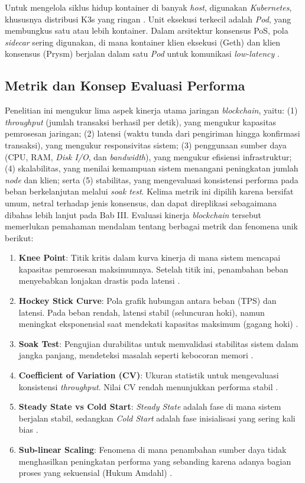 Untuk mengelola siklus hidup kontainer di banyak \textit{host}, digunakan \textit{Kubernetes}, khususnya distribusi K3s yang ringan \cite{k3s_io}. Unit eksekusi terkecil adalah \textit{Pod}, yang membungkus satu atau lebih kontainer. Dalam arsitektur konsensus PoS, pola \textit{sidecar} sering digunakan, di mana kontainer klien eksekusi (Geth) dan klien konsensus (Prysm) berjalan dalam satu \textit{Pod} untuk komunikasi \textit{low-latency} \cite{singh2020}.

\subsection{Metrik dan Konsep Evaluasi Performa}

Penelitian ini mengukur lima aspek kinerja utama jaringan \textit{blockchain}, yaitu: (1) \textit{throughput} (jumlah transaksi berhasil per detik), yang mengukur kapasitas pemrosesan jaringan; (2) latensi (waktu tunda dari pengiriman hingga konfirmasi transaksi), yang mengukur responsivitas sistem; (3) penggunaan sumber daya (CPU, RAM, \textit{Disk I/O}, dan \textit{bandwidth}), yang mengukur efisiensi infrastruktur; (4) skalabilitas, yang menilai kemampuan sistem menangani peningkatan jumlah \textit{node} dan klien; serta (5) stabilitas, yang mengevaluasi konsistensi performa pada beban berkelanjutan melalui \textit{soak test}. Kelima metrik ini dipilih karena bersifat umum, netral terhadap jenis konsensus, dan dapat direplikasi sebagaimana dibahas lebih lanjut pada Bab III. Evaluasi kinerja \textit{blockchain} tersebut memerlukan pemahaman mendalam tentang berbagai metrik dan fenomena unik berikut:

\begin{enumerate}
    \item \textbf{Knee Point}: Titik kritis dalam kurva kinerja di mana sistem mencapai kapasitas pemrosesan maksimumnya. Setelah titik ini, penambahan beban menyebabkan lonjakan drastis pada latensi \cite{avritzer2020}.
    \item \textbf{Hockey Stick Curve}: Pola grafik hubungan antara beban (TPS) dan latensi. Pada beban rendah, latensi stabil (seluncuran hoki), namun meningkat eksponensial saat mendekati kapasitas maksimum (gagang hoki) \cite{gregg2020}.
    \item \textbf{Soak Test}: Pengujian durabilitas untuk memvalidasi stabilitas sistem dalam jangka panjang, mendeteksi masalah seperti kebocoran memori \cite{hyperledger_caliper}.
    \item \textbf{Coefficient of Variation (CV)}: Ukuran statistik untuk mengevaluasi konsistensi \textit{throughput}. Nilai CV rendah menunjukkan performa stabil \cite{jain1991}.
    \item \textbf{Steady State vs Cold Start}: \textit{Steady State} adalah fase di mana sistem berjalan stabil, sedangkan \textit{Cold Start} adalah fase inisialisasi yang sering kali bias \cite{spec2021}.
    \item \textbf{Sub-linear Scaling}: Fenomena di mana penambahan sumber daya tidak menghasilkan peningkatan performa yang sebanding karena adanya bagian proses yang sekuensial (Hukum Amdahl) \cite{amdahl1967}.
\end{enumerate}

